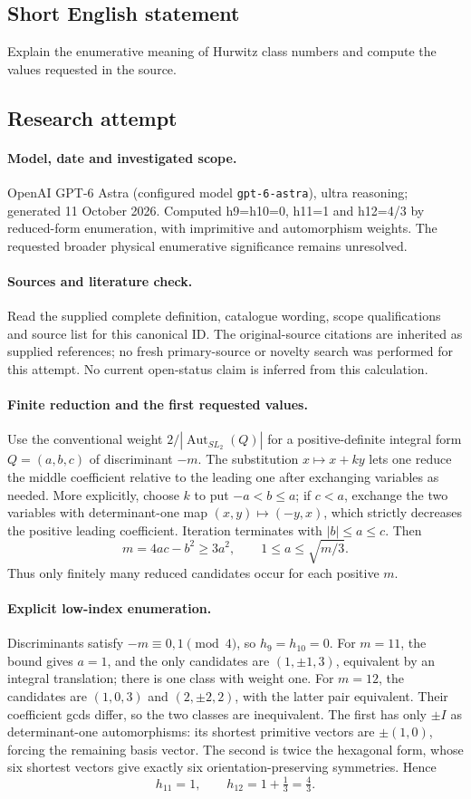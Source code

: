 \documentclass[11pt]{article}
\begin{document}
\subsection{Short English statement}
Explain the enumerative meaning of Hurwitz class numbers and compute the values requested in the source.
\subsection{Research attempt}
\paragraph{Model, date and investigated scope.}
OpenAI GPT-6 Astra (configured model \texttt{gpt-6-astra}), ultra reasoning; generated 11 October 2026. Computed h9=h10=0, h11=1 and h12=4/3 by reduced-form enumeration, with imprimitive and automorphism weights. The requested broader physical enumerative significance remains unresolved.

\paragraph{Sources and literature check.}
Read the supplied complete definition, catalogue wording, scope qualifications and source list for this canonical ID. The original-source citations are inherited as supplied references; no fresh primary-source or novelty search was performed for this attempt. No current open-status claim is inferred from this calculation.

\paragraph{Finite reduction and the first requested values.}Use the conventional weight \(2/|\operatorname{Aut}_{SL_2}(Q)|\) for a positive-definite integral form \(Q=(a,b,c)\) of discriminant \(-m\). The substitution \(x\mapsto x+ky\) lets one reduce the middle coefficient relative to the leading one after exchanging variables as needed. More explicitly, choose \(k\) to put \(-a<b\le a\); if \(c<a\), exchange the two variables with determinant-one map \((x,y)\mapsto(-y,x)\), which strictly decreases the positive leading coefficient. Iteration terminates with \(|b|\le a\le c\). Then
\[m=4ac-b^2\ge3a^2,\qquad 1\le a\le\sqrt{m/3}.
\]
Thus only finitely many reduced candidates occur for each positive \(m\).
\paragraph{Explicit low-index enumeration.}Discriminants satisfy \(-m\equiv0,1\pmod4\), so \(h_9=h_{10}=0\). For \(m=11\), the bound gives \(a=1\), and the only candidates are \((1,\pm1,3)\), equivalent by an integral translation; there is one class with weight one. For \(m=12\), the candidates are \((1,0,3)\) and \((2,\pm2,2)\), with the latter pair equivalent. Their coefficient gcds differ, so the two classes are inequivalent. The first has only \(\pm I\) as determinant-one automorphisms: its shortest primitive vectors are \(\pm(1,0)\), forcing the remaining basis vector. The second is twice the hexagonal form, whose six shortest vectors give exactly six orientation-preserving symmetries. Hence
\[h_{11}=1,\qquad h_{12}=1+\tfrac13=\tfrac43.
\]
\end{document}
